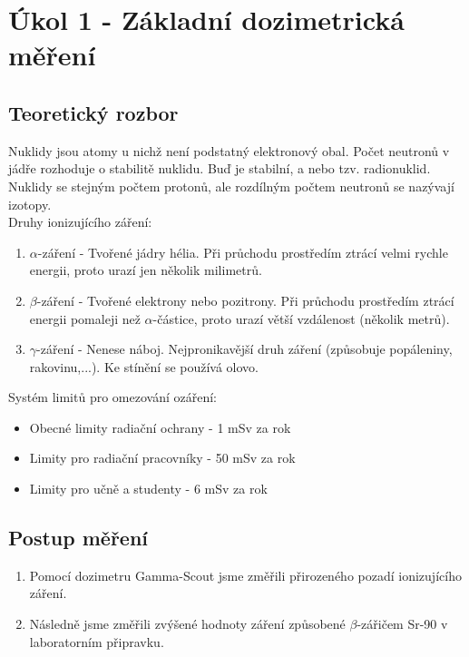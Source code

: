 \documentclass{protokol}
\begin{document}
\pagebreak 

\section{Úkol 1 - Základní dozimetrická měření}
    \subsection{Teoretický rozbor}
    Nuklidy jsou atomy u nichž není podstatný elektronový obal. Počet neutronů v jádře rozhoduje o stabilitě nuklidu. Buď je stabilní, a nebo tzv. radionuklid. Nuklidy se stejným počtem protonů, ale
    rozdílným počtem neutronů se nazývají izotopy.\\Druhy ionizujícího záření:
    \begin{enumerate}
        \item $\alpha$-záření - Tvořené jádry hélia. Při průchodu prostředím ztrácí velmi rychle energii, proto urazí jen několik milimetrů.
        \item $\beta$-záření - Tvořené elektrony nebo pozitrony. Při průchodu prostředím ztrácí energii pomaleji než $\alpha$-částice, proto urazí větší vzdálenost (několik metrů).
        \item $\gamma$-záření - Nenese náboj. Nejpronikavější druh záření (způsobuje popáleniny, rakovinu,...). Ke stínění se používá olovo.
    \end{enumerate}
    Systém limitů pro omezování ozáření:
    \begin{itemize}
        \item Obecné limity radiační ochrany - 1 mSv za rok
        \item Limity pro radiační pracovníky - 50 mSv za rok
        \item Limity pro učně a studenty - 6 mSv za rok
    \end{itemize}

    \subsection{Postup měření}
    \begin{enumerate}
        \item Pomocí dozimetru Gamma-Scout jsme změřili přirozeného pozadí ionizujícího záření.
        \item Následně jsme změřili zvýšené hodnoty záření způsobené $\beta$-zářičem Sr-90 v laboratorním připravku.
    \end{enumerate}
\end{document}
